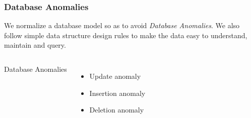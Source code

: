 \documentclass[xcolor=dvipsnames]{beamer}
\begin{document}
{
 
  \begin{frame}[fragile]
    \frametitle{Database Anomalies}

    We normalize a database model so as to avoid \textit{Database Anomalies}.
    We also follow simple data structure design rules to make the data easy to
    understand, maintain and query.

    \vfill
    
    \begin{columns}[c]
      Database Anomalies

      \begin{itemize}
      \item Update anomaly
      \item Insertion anomaly
      \item Deletion anomaly
      \end{itemize}
      
    \end{columns}
  \end{frame}
}
\end{document}

